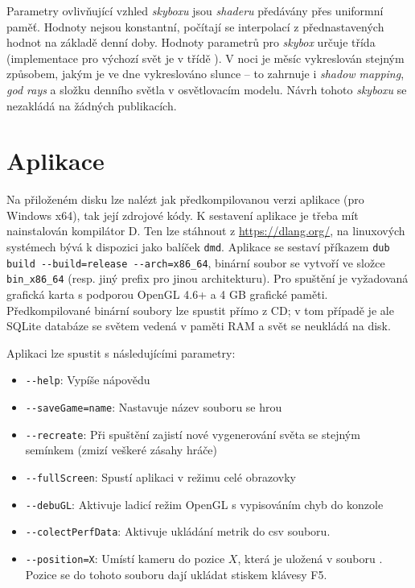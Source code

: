 Parametry ovlivňující vzhled \textit{skyboxu} jsou \textit{shaderu} předávány přes uniformní paměť. Hodnoty nejsou konstantní, počítají se interpolací z přednastavených hodnot na základě denní doby. Hodnoty parametrů pro \textit{skybox} určuje třída  (implementace pro výchozí svět je v třídě ). V noci je měsíc vykreslován stejným způsobem, jakým je ve dne vykreslováno slunce -- to zahrnuje i \textit{shadow mapping}, \textit{god rays} a složku denního světla v osvětlovacím modelu.  Návrh tohoto \textit{skyboxu} se nezakládá na žádných publikacích.


\vfill



\vfill


\chapter{Aplikace} \label{ch:app}
Na přiloženém disku lze nalézt jak předkompilovanou verzi aplikace (pro Windows x64), tak její zdrojové kódy. K sestavení aplikace je třeba mít nainstalován kompilátor D. Ten lze stáhnout z \url{https://dlang.org/}, na linuxových systémech bývá k dispozici jako balíček \verb|dmd|. Aplikace se sestaví příkazem \verb|dub build --build=release --arch=x86_64|, binární soubor se vytvoří ve složce \verb|bin_x86_64| (resp. jiný prefix pro jinou architekturu). Pro spuštění je vyžadovaná grafická karta s podporou OpenGL 4.6+ a 4 GB grafické paměti. Předkompilované binární soubory lze spustit přímo z CD; v tom případě je ale SQLite databáze se světem vedená v paměti RAM a svět se neukládá na disk.

Aplikaci lze spustit s následujícími parametry:
\begin{itemize}
	\item \verb|--help|: Vypíše nápovědu
	\item \verb|--saveGame=name|: Nastavuje název souboru se hrou
	\item \verb|--recreate|: Při spuštění zajistí nové vygenerování světa se stejným semínkem (zmizí veškeré zásahy hráče)
	\item \verb|--fullScreen|: Spustí aplikaci v režimu celé obrazovky
	\item \verb|--debuGL|: Aktivuje ladicí režim OpenGL s vypisováním chyb do konzole
	\item \verb|--colectPerfData|: Aktivuje ukládání metrik do csv souboru.
	\item \verb|--position=X|: Umístí kameru do pozice $X$, která je uložená v souboru . Pozice se do tohoto souboru dají ukládat stiskem klávesy F5.
\end{itemize}

